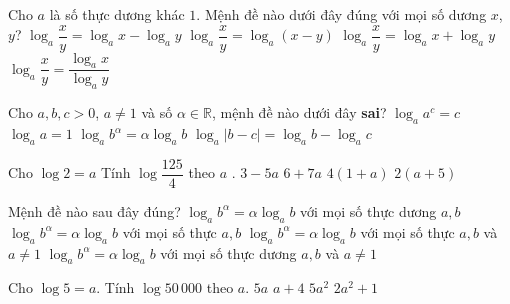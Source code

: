 \begin{ex}%
	Cho $a$ là số thực dương khác $1$. Mệnh đề nào dưới đây  đúng với mọi số dương $x$, $y$?
	\choice 
		{\True ${\log }_a\dfrac{x}{y}={\log  }_ax-{{\log }_a}y$}
		{${\log }_a\dfrac{x}{y}={\log }_a\left( x-y  \right)$}
		{${\log }_a\dfrac{x}{y}={\log  }_ax+{{\log }_a}y$}
		{${\log  }_a\dfrac{x}{y}=\dfrac{{\log }_ax}{{\log }_ay}$}
\end{ex}

\begin{ex}%
	Cho $a,b,c > 0$, $a\ne  1$ và số $\alpha \in \mathbb{R}$, mệnh đề nào dưới đây {\bf sai}?
	\choice 
		{$\log_a a^c=c$} 
		{$\log_a a=1$} 
		{$\log_a b^{\alpha}=\alpha \log_a b$} 
		{\True $\log_a \left|b-c\right|=\log_a  b-\log_a c$}
\end{ex}

\begin{ex}%
	Cho $\log 2=a$  Tính $\log\dfrac{125}{4}$ theo $a$ .
	\choice 
		{\True $3-5a$} 
		 {$6+7a$}
		{$4\left(1+a\right)$} 
		{$2\left(a+5\right)$} 
\end{ex}

\begin{ex}%
	Mệnh đề nào sau đây đúng? 
	\choice 
		{$\log_a b^{\alpha}=\alpha \log_a b$ với mọi số thực  dương $a, b$}
		{$\log_a b^{\alpha}=\alpha \log_a b$  với mọi số thực $a, b$}
		{$\log_a b^{\alpha}=\alpha \log_a b$ với mọi số  thực $a, b$ và $a \neq 1$}
		{\True $\log_a b^{\alpha}=\alpha  \log_a b$ với mọi số thực dương $a, b$ và $a \neq 1$}
\end{ex}

\begin{ex}%
	Cho $\log 5=a$.  Tính $\log 50\,000$ theo $ a$.
	 \choice
		{$ 5a$} 
		{\True  $ a+4$}
		 {$ 5a^2$}
		{$  2a^2+1$}
\end{ex}

